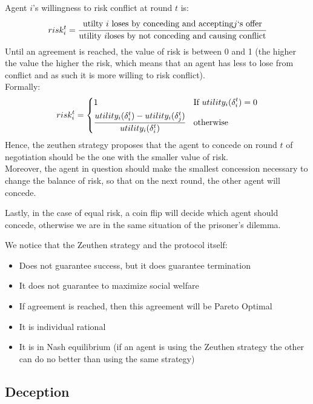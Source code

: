 Agent $i$'s willingness to risk conflict at round $t$ is:
\[risk^t_i = \cfrac{\text{utilty }i\text{ loses by conceding and accepting}j\text{`s offer} }{\text{utility }i\text{loses by not conceding and causing conflict}}\]
Until an agreement is reached, the value of risk is between 0 and 1 (the higher the value the higher the risk, which means that an agent has less to lose from conflict and as such it is more willing to risk conflict).\\
Formally:
\[risk^t_i =
\begin{dcases}
1 & \text{If }utility_i(\delta_i^t)=0\\
\cfrac{utility_i(\delta_i^t) - utility_i(\delta_j^t)}{utility_i(\delta_i^t)} &\text{otherwise}
\end{dcases}
\]
Hence, the zeuthen strategy proposes that the agent to concede on round $t$ of negotiation should be the one with the smaller value of risk.\\
Moreover, the agent in question should make the smallest concession necessary to change the balance of risk, so that on the next round, the other agent will concede.

Lastly, in the case of equal risk, a coin flip will decide which agent should concede, otherwise we are in the same situation of the prisoner's dilemma.

We notice that the Zeuthen strategy and the protocol itself:
\begin{itemize}
\item Does not guarantee success, but it does guarantee termination
\item It does not guarantee to maximize social welfare
\item If agreement is reached, then this agreement will be Pareto Optimal
\item It is individual rational
\item It is in Nash equilibrium (if an agent is using the Zeuthen strategy the other can do no better than using the same strategy)
\end{itemize}

\subsection{Deception}

